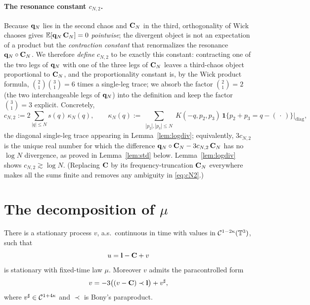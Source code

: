 \paragraph{The resonance constant $c_{N,2}$.}
Because $\mathbf{q}_N$ lies in the second chaos and $\mathbf{C}_N$ in the third,
orthogonality of Wick chaoses gives $\mathbb{E}[\mathbf{q}_N\,\mathbf{C}_N]=0$ \emph{pointwise};
the divergent object is not an expectation of a product but the \emph{contraction
constant} that renormalizes the resonance $\mathbf{q}_N\circ\mathbf{C}_N$. We therefore
\emph{define} $c_{N,2}$ to be exactly this constant: contracting one of the two
legs of $\mathbf{q}_N$ with one of the three legs of $\mathbf{C}_N$ leaves a third-chaos
object proportional to $\mathbf{C}_N$, and the proportionality constant is, by the
Wick product formula, $\binom{2}{1}\binom{3}{1}=6$ times a single-leg trace; we
absorb the factor $\binom{2}{1}=2$ (the two interchangeable legs of $\mathbf{q}_N$)
into the definition and keep the factor $\binom31=3$ explicit. Concretely,
\begin{equation}\label{eq:cN2}
c_{N,2}:=2\sum_{|q|\le N}s(q)\,\kappa_N(q),\qquad
\kappa_N(q):=\sum_{\substack{|p_2|,|p_3|\le N}}K(-q,p_2,p_3)\,\mathbf 1\{p_2+p_3=q-(\,\cdot\,)\}\big|_{\mathrm{diag}},
\end{equation}
the diagonal single-leg trace appearing in Lemma~\ref{lem:logdiv}; equivalently,
$3c_{N,2}$ is the unique real number for which the difference
$\mathbf{q}_N\circ\mathbf{C}_N-3c_{N,2}\,\mathbf{C}_N$ has no $\log N$ divergence, as proved in
Lemma~\ref{lem:std} below. Lemma~\ref{lem:logdiv} shows $c_{N,2}\gtrsim\log N$.
(Replacing $\mathbf{C}$ by its frequency-truncation $\mathbf{C}_N$ everywhere makes all the
sums finite and removes any ambiguity in \eqref{eq:cN2}.)

\section*{The decomposition of $\mu$}

\begin{qoneproposition}[\cite{HM18,EW24,CC18}]\label{prop:decomp}
There is a stationary process $v$, a.s.\ continuous in time with values in
$\mathcal{C}^{1-2\kappa}(\mathbb{T}^3)$, such that
\begin{equation}\label{eq:u}
u=\mathbf{l}-\mathbf{C}+v
\end{equation}
is stationary with fixed-time law $\mu$. Moreover $v$ admits the paracontrolled
form
\begin{equation}\label{eq:v}
v=-3\bigl((v-\mathbf{C})\prec\mathbf{l}\bigr)+v^\sharp,
\end{equation}
where $v^\sharp\in\mathcal{C}^{1+4\kappa}$ and $\prec$ is Bony's paraproduct.
\end{qoneproposition}

